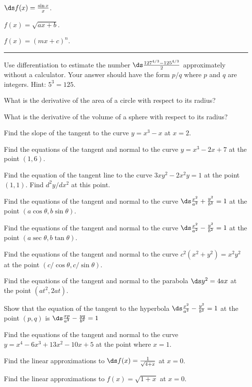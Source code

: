 \begin{multicols}{2}
  \problem  $\ds f(x)= \frac{\sin x}{x}$.


  \problem  $f(x) = \sqrt{ax+b}$.


  \problem  $f(x) = (m x +c )^n$.

  \hrule


  \problem Use differentiation to estimate the number $\ds
  \frac{127^{4/3}-125^{4/3}}{2}$ approximately without a calculator. Your
  answer should have the form $p/q$ where $p$ and $q$ are integers.  Hint:
  $5^3=125$.


  \problem\label{CircleCircumference} What is the derivative of the area of a
  circle with respect to its radius?


  \problem \label{SphereArea} What is the derivative of the volume of a
  sphere with respect to its radius?


  \problem Find the slope of the tangent to the curve $y=x^3-x$ at $x=2$.


  \problem Find the equations of the tangent and normal to the curve
  $y=x^3-2x+7$ at the point $(1,6)$.


  \problem Find the equation of the tangent line to the curve $3xy^2-2x^2y=1$
  at the point $(1,1)$. Find $d^2y/dx^2$ at this point.


  \problem Find the equations of the tangent and normal to the curve
  $\ds\frac{x^2}{ a^2}+\frac{y^2}{ b^2}=1 $ at the point $(a\cos\theta,
  b\sin\theta)$.


  \problem Find the equations of the tangent and normal to the curve
  $\ds\frac{x^2}{ a^2}-\frac{y^2}{ b^2}=1 $ at the point $(a\sec\theta,
  b\tan\theta)$.


  \problem Find the equations of the tangent and normal to the curve
  $c^2(x^2+y^2)=x^2y^2$ at the point $(c/\cos\theta,c/\sin\theta)$.


  \problem Find the equations of the tangent and normal to the parabola $\ds
  y^2=4ax$ at the point $(at^2, 2at)$.


  \problem Show that the equation of the tangent to the hyperbola
  $\ds\frac{x^2}{ a^2}-\frac{y^2}{ b^2}=1 $ at the point $(p,q)$ is
  $\ds\frac{xp}{ a^2}-\frac{yq}{ b^2}=1 $


  \problem Find the equations of the tangent and normal to the curve
  $y=x^4-6x^3+13x^2-10x+5$ at the point where $x=1$.


  \problem Find the linear approximations to $\ds f(x)=\frac{1}{ \sqrt{4+x}}$
  at $x=0$.


  \problem Find the linear approximations to $f(x)=\sqrt{1+x}$ at $x=0$.



\end{multicols}
